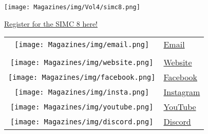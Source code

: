 \documentclass{article}
\begin{document}
\begin{multicols}{3}
\begin{center}
\texttt{[image: Magazines/img/Vol4/simc8.png]} 

\href{https://docs.google.com/forms/d/e/1FAIpQLScB4ig6bxgUfaDa0i6csRy8Wmn3a3ezEV81MeVDZOp4wKVNTA/viewform}{Register for the SIMC 8 here!}
\end{center}

\vspace{1.0cm}
\begin{tabular}{c l}
  \texttt{[image: Magazines/img/email.png]}
    & \href{mailto:seattleinfinitymathcircle@gmail.com}{Email}\\
  \;\\
  \texttt{[image: Magazines/img/website.png]}
    & \href{https://seattleinfinity.org}{Website} \\
  \texttt{[image: Magazines/img/facebook.png]}
    & \href{https://www.facebook.com/simathcircle/}{Facebook} \\
  \texttt{[image: Magazines/img/insta.png]}
    & \href{https://www.instagram.com/seattleinfinitymathcircle/}{Instagram} \\
  \texttt{[image: Magazines/img/youtube.png]}
    & \href{https://www.youtube.com/channel/UCgwA-iysWPc_XG0R0AZ5z5g/videos}{YouTube} \\
  \texttt{[image: Magazines/img/discord.png]}
    & \href{https://discord.gg/2Ma3dURhTt}{Discord} 
\end{tabular}

\end{multicols}
\end{document}
